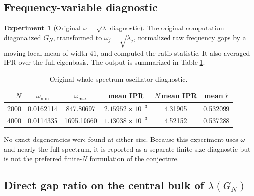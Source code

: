 \documentclass[11pt]{amsart}
\numberwithin{equation}{section}
\theoremstyle{plain}
\theoremstyle{definition}
\newtheorem{experiment}[theorem]{Experiment}
\theoremstyle{remark}
\begin{document}
\subsection{Frequency-variable diagnostic}
\label{subsec:original_oscillator}

\begin{experiment}[Original $\omega=\sqrt\lambda$ diagnostic]
\label{exp:original_oscillator}
The original computation diagonalized $G_N$, transformed to $\omega_j=\sqrt{\lambda_j}$, normalized raw frequency gaps by a moving local mean of width $41$, and computed the ratio statistic.  It also averaged IPR over the full eigenbasis.  The output is summarized in Table \ref{tab:original_oscillator}.

\begin{table}[htbp]
\centering
\caption{Original whole-spectrum oscillator diagnostic.}
\label{tab:original_oscillator}
\begin{tabular}{rccccc}
\toprule
$N$ & $\omega_{\min}$ & $\omega_{\max}$ & mean IPR & $N\,$mean IPR & mean $\widetilde r$\\
\midrule
2000 & 0.0162114 & 847.80697  & $2.15952\times10^{-3}$ & 4.31905 & 0.532099\\
4000 & 0.0114335 & 1695.10660 & $1.13038\times10^{-3}$ & 4.52152 & 0.537288\\
\bottomrule
\end{tabular}
\end{table}

No exact degeneracies were found at either size.  Because this experiment uses $\omega$ and nearly the full spectrum, it is reported as a separate finite-size diagnostic but is not the preferred finite-$N$ formulation of the conjecture.
\end{experiment}

\subsection{Direct gap ratio on the central bulk of $\lambda(G_N)$}
\label{subsec:direct_bulk_ratio}
\end{document}
